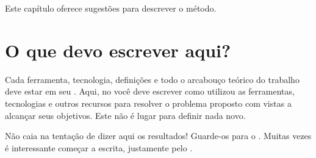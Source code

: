\label{Metodo}

Este capítulo oferece sugestões para descrever o método.

\section{O que devo escrever aqui?}%

Cada ferramenta, tecnologia, definições e todo o arcabouço teórico do trabalho deve estar em seu .
Aqui, no  você deve escrever como utilizou as ferramentas, tecnologias e outros recursos para resolver o problema proposto com vistas a alcançar seus objetivos.
Este não é lugar para definir nada novo.


Não caia na tentação de dizer aqui os resultados! Guarde-os para o . Muitas vezes é interessante começar a escrita, justamente pelo .

\selectfont%